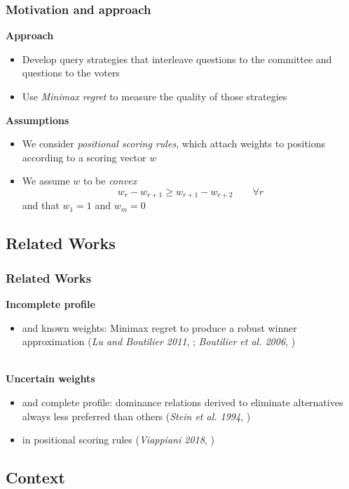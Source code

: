 \documentclass{beamer}
\begin{document}
\begin{frame}
	\frametitle{Motivation and approach}
	 \textbf{Approach}
	\begin{itemize}
		\item Develop query strategies that interleave questions to the committee and questions to the voters
		\item Use \emph{Minimax regret} to measure the quality of those strategies
	\end{itemize}
	 \textbf{Assumptions}
	\begin{itemize}
		\item We consider \textit{positional scoring rules}, which attach weights to positions according to a scoring vector $w$
		\item We assume $w$ to be \textit{convex}
		\[ w_r - w_{r+1} \geq w_{r+1}-w_{r+2} \qquad \forall r\]
		and that $w_1=1$ and $w_m=0$
	\end{itemize}	
\end{frame}

\subsection{Related Works}
\begin{frame}
	\frametitle{Related Works}
	\textbf{Incomplete profile}  
	\begin{itemize}
		\item and known weights: Minimax regret to produce a robust winner approximation (\textit{Lu and Boutilier 2011}, \cite{Lu2011}; \textit{Boutilier et al. 2006}, \cite{Boutilier2006})
	\end{itemize}~\\
	\textbf{Uncertain weights} 
	\begin{itemize}
		\item and complete profile: dominance relations derived to eliminate alternatives always less preferred than others (\textit{Stein et al. 1994}, \cite{Stein1994})
		\item in positional scoring rules (\textit{Viappiani 2018}, \cite{Viappiani2018})
	\end{itemize}
\end{frame}

\subsection{Context}
\end{document}
